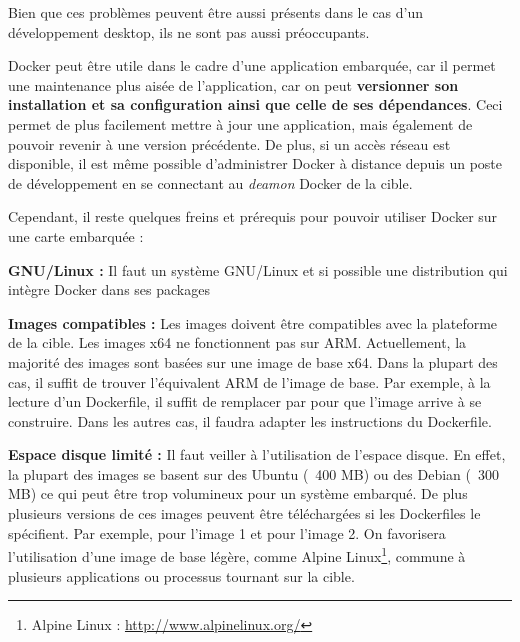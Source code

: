 Bien que ces problèmes peuvent être aussi présents dans le cas d'un développement desktop, ils ne sont pas aussi préoccupants.

Docker peut être utile dans le cadre d'une application embarquée, car il permet une maintenance plus aisée de l'application, car on peut \textbf{versionner son installation et sa configuration ainsi que celle de ses dépendances}. Ceci permet de plus facilement mettre à jour une application, mais également de pouvoir revenir à une version précédente. De plus, si un accès réseau est disponible, il est même possible d'administrer Docker à distance depuis un poste de développement en se connectant au \textit{deamon} Docker de la cible.

Cependant, il reste quelques freins et prérequis pour pouvoir utiliser Docker sur une carte embarquée :

\textbf{GNU/Linux : } Il faut un système GNU/Linux et si possible une distribution qui intègre Docker dans ses packages

\textbf{Images compatibles : } Les images doivent être compatibles avec la plateforme de la cible. Les images x64 ne fonctionnent pas sur ARM. Actuellement, la majorité des images sont basées sur une image de base x64. Dans la plupart des cas, il suffit de trouver l'équivalent ARM de l'image de base. Par exemple, à la lecture d'un Dockerfile, il suffit de remplacer  par  pour que l'image arrive à se construire. Dans les autres cas, il faudra adapter les instructions du Dockerfile.

\textbf{Espace disque limité : } Il faut veiller à l'utilisation de l'espace disque. En effet, la plupart des images se basent sur des Ubuntu (~400 MB) ou des Debian (~300 MB) ce qui peut être trop volumineux pour un système embarqué. De plus plusieurs versions de ces images peuvent être téléchargées si les Dockerfiles le spécifient. Par exemple,  pour l'image 1 et  pour l'image 2. On favorisera l'utilisation d'une image de base légère, comme Alpine Linux\footnote{Alpine Linux : \url{http://www.alpinelinux.org/}}, commune à plusieurs applications ou processus tournant sur la cible. 
